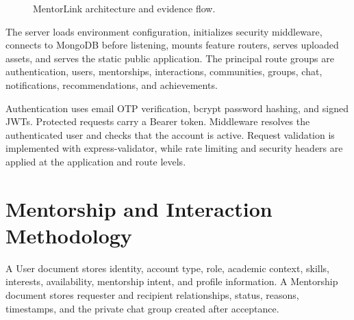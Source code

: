 \documentclass[conference]{IEEEtran}
\begin{document}
\begin{figure}[t]
\centering
{}
\caption{MentorLink architecture and evidence flow.}
\label{fig:architecture}
\end{figure}

The server loads environment configuration, initializes security middleware, connects to MongoDB before listening, mounts feature routers, serves uploaded assets, and serves the static public application. The principal route groups are authentication, users, mentorships, interactions, communities, groups, chat, notifications, recommendations, and achievements.

Authentication uses email OTP verification, bcrypt password hashing, and signed JWTs. Protected requests carry a Bearer token. Middleware resolves the authenticated user and checks that the account is active. Request validation is implemented with express-validator, while rate limiting and security headers are applied at the application and route levels.

\section{Mentorship and Interaction Methodology}
A User document stores identity, account type, role, academic context, skills, interests, availability, mentorship intent, and profile information. A Mentorship document stores requester and recipient relationships, status, reasons, timestamps, and the private chat group created after acceptance.
\end{document}
